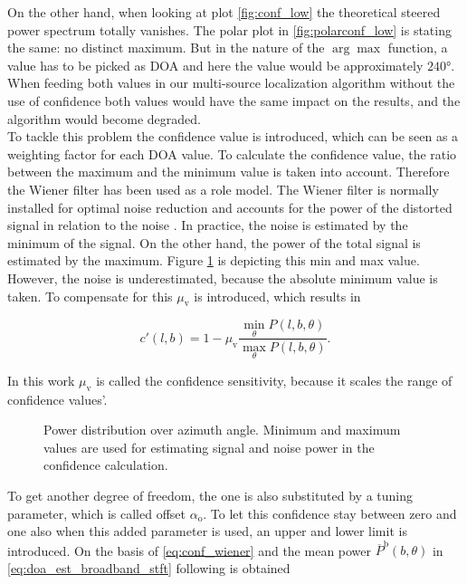 On the other hand, when looking at plot \ref{fig:conf_low} the theoretical steered power spectrum totally vanishes. The polar plot in \ref{fig:polarconf_low} is stating the same: no distinct maximum. But in the nature of the $\arg \max$ function, a value has to be picked as \ac{DOA} and here the value would be approximately $\ang{240}$. When feeding both values in our multi-source localization algorithm without the use of confidence both values would have the same impact on the results, and the algorithm would become degraded. \\
To tackle this problem the confidence value is introduced, which can be seen as a weighting factor for each \ac{DOA} value. To calculate the confidence value, the ratio between the maximum and the minimum value is taken into account. Therefore the Wiener filter has been used as a role model. The Wiener filter is normally installed for optimal noise reduction and accounts for the power of the distorted signal in relation to the noise \cite[Chapter~6.5]{loizou2013speech}.
In practice, the noise is estimated by the minimum of the signal. On the other hand, the power of the total signal is estimated by the maximum. Figure \ref{fig:conf_1} is depicting this min and max value. However, the noise is underestimated, because the absolute minimum value is taken. To compensate for this $\mu_\text{v}$ is introduced, which results in

\begin{equation}
c'(l,b)= 1-\mu_\text{v}\frac{\min_\theta P(l,b,\theta) }{\max_\theta P(l,b,\theta)}.
\label{eq:conf_wiener}
\end{equation}

In this work $\mu_\text{v}$ is called the confidence sensitivity, because it scales the range of confidence values'.
\begin{figure}[t]
	\centering
    \def\svgwidth{.6\linewidth}
    \small
	\caption{Power distribution over azimuth angle. Minimum and maximum values are used for estimating signal and noise power in the confidence calculation.}
	\label{fig:conf_1}
\end{figure}
To get another degree of freedom, the one is also substituted by a tuning parameter, which is called offset $\alpha_\text{o}$. To let this confidence stay between zero and one also when this added parameter is used, an upper and lower limit is introduced. On the basis of \ref{eq:conf_wiener} and the mean power $\overline P^\text{b}(b,\theta)$ in \ref{eq:doa_est_broadband_stft} following is obtained

